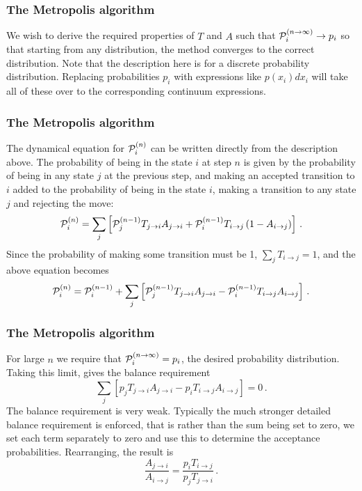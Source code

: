 \documentclass{beamer}
\begin{document}
\begin{frame}
\frametitle{The Metropolis algorithm}

\begin{block}{}
We wish to derive the required properties of $T$ and $A$ such that
${\cal P}_i^{(n\rightarrow \infty)} \rightarrow p_i$ so that starting
from any distribution, the method converges to the correct distribution.
Note that the description here is for a discrete probability distribution.
Replacing probabilities $p_i$ with expressions like $p(x_i)dx_i$ will
take all of these over to the corresponding continuum expressions.

\end{block}
\end{frame}

\begin{frame}
\frametitle{The Metropolis algorithm}

\begin{block}{}
The dynamical equation for ${\cal P}_i^{(n)}$ can be written directly from
the description above. The probability of being in the state $i$ at step $n$
is given by the probability of being in any state $j$ at the previous step,
and making an accepted transition to $i$ added to the probability of
being in the state $i$, making a transition to any state $j$ and
rejecting the move:
\[
{\cal P}^{(n)}_i = \sum_j \left [
{\cal P}^{(n-1)}_jT_{j\rightarrow i} A_{j\rightarrow i} 
+{\cal P}^{(n-1)}_iT_{i\rightarrow j}\left ( 1- A_{i\rightarrow j} \right)
\right ] \,.
\]
Since the probability of making some transition must be 1,
$\sum_j T_{i\rightarrow j} = 1$, and the above equation becomes
\[
{\cal P}^{(n)}_i = {\cal P}^{(n-1)}_i +
 \sum_j \left [
{\cal P}^{(n-1)}_jT_{j\rightarrow i} A_{j\rightarrow i} 
-{\cal P}^{(n-1)}_iT_{i\rightarrow j}A_{i\rightarrow j}
\right ] \,.
\]
\end{block}
\end{frame}

\begin{frame}
\frametitle{The Metropolis algorithm}

\begin{block}{}
For large $n$ we require that ${\cal P}^{(n\rightarrow \infty)}_i = p_i$,
the desired probability distribution. Taking this limit, gives the
balance requirement
\[
 \sum_j \left [
p_jT_{j\rightarrow i} A_{j\rightarrow i}
-p_iT_{i\rightarrow j}A_{i\rightarrow j}
\right ] = 0 \,.
\]
The balance requirement is very weak. Typically the much stronger detailed
balance requirement is enforced, that is rather than the sum being
set to zero, we set each term separately to zero and use this
to determine the acceptance probabilities. Rearranging, the result is
\[
\frac{ A_{j\rightarrow i}}{A_{i\rightarrow j}}
= \frac{p_iT_{i\rightarrow j}}{ p_jT_{j\rightarrow i}} \,.
\]
\end{block}
\end{frame}
\end{document}
